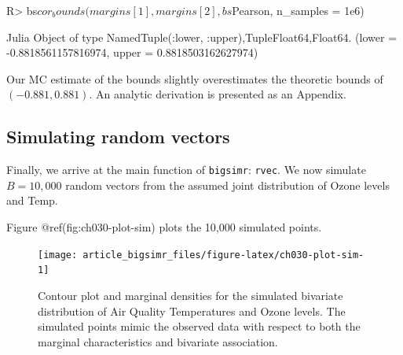 \documentclass[
]{jss}
\begin{document}
\begin{CodeChunk}
\begin{CodeInput}
R> bs$cor_bounds(margins[1], margins[2], bs$Pearson, n_samples = 1e6)
\end{CodeInput}
\begin{CodeOutput}
Julia Object of type NamedTuple{(:lower, :upper),Tuple{Float64,Float64}}.
(lower = -0.8818561157816974, upper = 0.8818503162627974)
\end{CodeOutput}
\end{CodeChunk}

Our MC estimate of the bounds slightly overestimates the theoretic
bounds of \((-0.881, 0.881)\). An analytic derivation is presented as an
Appendix.

\hypertarget{simulating-random-vectors}{%
\subsection{Simulating random vectors}\label{simulating-random-vectors}}

Finally, we arrive at the main function of \texttt{bigsimr}:
\texttt{rvec}. We now simulate \(B=10,000\) random vectors from the
assumed joint distribution of Ozone levels and Temp.

\begin{CodeChunk}
\end{CodeChunk}

Figure @ref(fig:ch030-plot-sim) plots the 10,000 simulated points.

\begin{CodeChunk}
\begin{figure}

{\centering \texttt{[image: article\_bigsimr\_files/figure-latex/ch030-plot-sim-1]} 

}

\caption[Contour plot and marginal densities for the simulated bivariate distribution of Air Quality Temperatures and Ozone levels]{Contour plot and marginal densities for the simulated bivariate distribution of Air Quality Temperatures and Ozone levels. The simulated points mimic the observed data with respect to both the marginal characteristics and bivariate association.}\label{fig:ch030-plot-sim}
\end{figure}
\end{CodeChunk}
\end{document}

